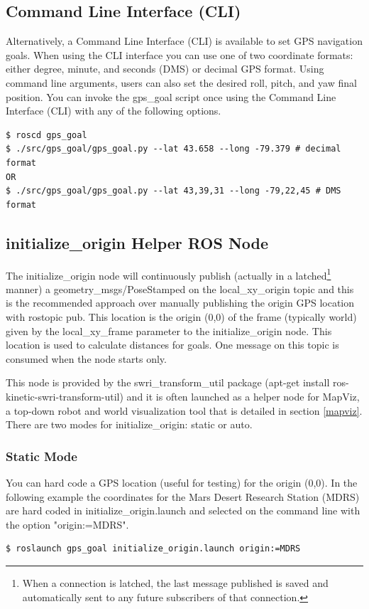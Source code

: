 \documentclass[runningheads,a4paper]{llncs}
\begin{document}
\subsection{Command Line Interface (CLI)}

Alternatively, a Command Line Interface (CLI) is available to set GPS navigation goals. When using the CLI interface you can use one of two coordinate formats: either degree, minute, and seconds (DMS) or decimal GPS format. Using command line arguments, users can also set the desired roll, pitch, and yaw final position. You can invoke the gps\_goal script once using the Command Line Interface (CLI) with any of the following options.

\begin{lstlisting}[frame=single,basicstyle=\ttfamily\footnotesize,breaklines=true,caption={Example usages of the gps\_goal CLI script to set a navigation goal.}]
$ roscd gps_goal
$ ./src/gps_goal/gps_goal.py --lat 43.658 --long -79.379 # decimal format
OR 
$ ./src/gps_goal/gps_goal.py --lat 43,39,31 --long -79,22,45 # DMS format
\end{lstlisting}

\subsection{initialize\_origin Helper ROS Node}\label{init_origin}
The initialize\_origin node will continuously publish (actually in a latched\footnote{When a connection is latched, the last message published is saved and automatically sent to any future subscribers of that connection.} manner) a geometry\_msgs/PoseStamped on the local\_xy\_origin topic and this is the recommended approach over  manually publishing the origin GPS location with rostopic pub. This location is the origin (0,0) of the frame (typically world) given by the local\_xy\_frame parameter to the initialize\_origin node. This location is used to calculate distances for goals. One message on this topic is consumed when the node starts only.

This node is provided by the swri\_transform\_util package (apt-get install ros-kinetic-swri-transform-util) and it is often launched as a helper node for MapViz, a top-down robot and world visualization tool that is detailed in section \ref{mapviz}. There are two modes for initialize\_origin: static or auto.

\subsubsection*{Static Mode}
You can hard code a GPS location (useful for testing) for the origin (0,0). In the following example the coordinates for the Mars Desert Research Station (MDRS) are hard coded in initialize\_origin.launch and selected on the command line with the option "origin:=MDRS".
\begin{lstlisting}[frame=single,basicstyle=\ttfamily\footnotesize,breaklines=true]
$ roslaunch gps_goal initialize_origin.launch origin:=MDRS
\end{lstlisting}
\end{document}
